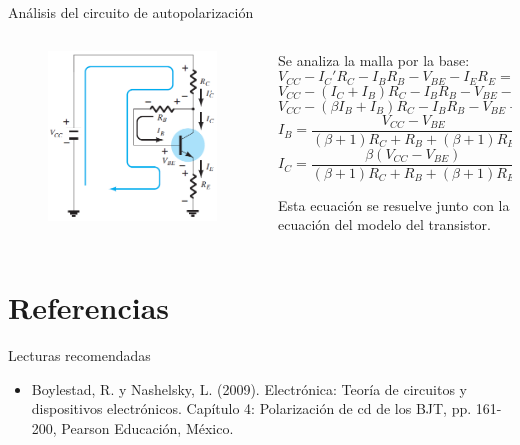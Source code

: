 \documentclass[t,aspectratio=169]{beamer}
\begin{document}
\begin{frame}{Análisis del circuito de autopolarización}


\begin{columns}
\begin{column}{0.35\textwidth}

\begin{figure}[H]
    \centering
    \includegraphics[width=\textwidth]{figures/polarizacion_autopolarizacion_2.png}
\end{figure}

\end{column}
\begin{column}{0.65\textwidth}

Se analiza la malla por la base:
%
\[ V_{CC} - I_C'R_C - I_B R_B - V_{BE} - I_E R_E = 0 \]
%
\[ V_{CC} - (I_C + I_B) R_C - I_B R_B - V_{BE} - I_E R_E = 0 \]
%
\[ V_{CC} - (\beta I_B + I_B) R_C - I_B R_B - V_{BE} - (\beta + 1) I_B R_E = 0 \]
%
\[ I_B = \dfrac{V_{CC} - V_{BE}}{(\beta + 1) R_C + R_B + (\beta + 1) R_E} \]
%
\[ I_C = \dfrac{\beta(V_{CC} - V_{BE})}{(\beta + 1) R_C + R_B + (\beta + 1) R_E} \]

Esta ecuación se resuelve junto con la ecuación del modelo del transistor.
\end{column}
\end{columns}

\end{frame}


\section{Referencias}

\begin{frame}{Lecturas recomendadas}

\begin{itemize}
    \item Boylestad, R. y Nashelsky, L. (2009). Electrónica: Teoría de circuitos y dispositivos electrónicos. Capítulo 4: Polarización de cd de los BJT, pp. 161-200, Pearson Educación, México.
\end{itemize}

\end{frame}
\end{document}
